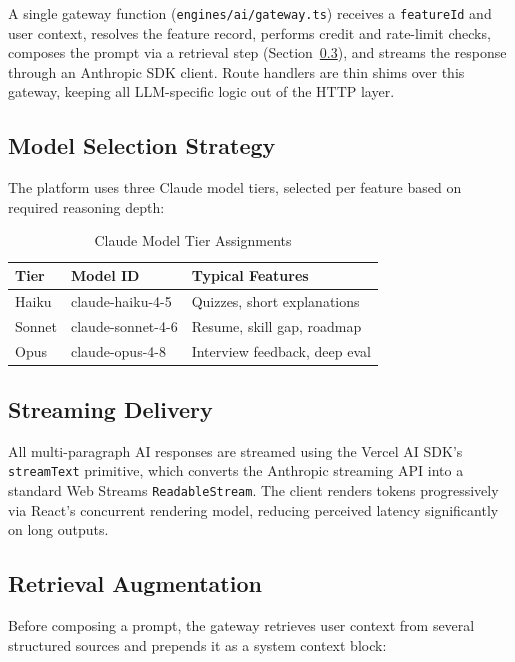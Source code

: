 \documentclass[conference]{IEEEtran}
\begin{document}
A single gateway function (\texttt{engines/ai/gateway.ts}) receives a
\texttt{featureId} and user context, resolves the feature record, performs
credit and rate-limit checks, composes the prompt via a retrieval step
(Section~\ref{sec:retrieval}), and streams the response through an Anthropic
SDK client. Route handlers are thin shims over this gateway, keeping all
LLM-specific logic out of the HTTP layer.

\subsection{Model Selection Strategy}

The platform uses three Claude model tiers, selected per feature based on
required reasoning depth:

\begin{table}[htbp]
\caption{Claude Model Tier Assignments}
\label{tab:models}
\centering
\begin{tabular}{lll}
\toprule
\textbf{Tier} & \textbf{Model ID} & \textbf{Typical Features} \\
\midrule
Haiku  & claude-haiku-4-5     & Quizzes, short explanations \\
Sonnet & claude-sonnet-4-6    & Resume, skill gap, roadmap \\
Opus   & claude-opus-4-8      & Interview feedback, deep eval \\
\bottomrule
\end{tabular}
\end{table}

\subsection{Streaming Delivery}

All multi-paragraph AI responses are streamed using the Vercel AI SDK's
\texttt{streamText} primitive, which converts the Anthropic streaming API into
a standard Web Streams \texttt{ReadableStream}. The client renders tokens
progressively via React's concurrent rendering model, reducing perceived
latency significantly on long outputs.

\subsection{Retrieval Augmentation}
\label{sec:retrieval}

Before composing a prompt, the gateway retrieves user context from several
structured sources and prepends it as a system context block:
\end{document}
